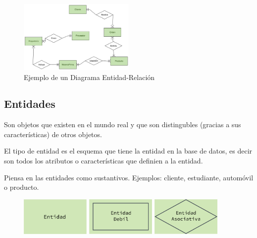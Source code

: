 \documentclass[12pt, fleqn]{report}                             %
\begin{document}
            \begin{figure}[h]
                \centering
                \includegraphics[width=0.50\textwidth]{ER-Diagram}
                \caption{Ejemplo de un Diagrama Entidad-Relación}
            \end{figure}




            \clearpage
            \subsection{Entidades}
                    
                Son objetos que existen en el mundo real y que son distingubles
                (gracias a sus características) de otros objetos.

                El tipo de entidad es el esquema que tiene la entidad en la base de datos,
                es decir son todos los atributos o características que definien a la entidad.

                Piensa en las entidades como sustantivos.
                Ejemplos: cliente, estudiante, automóvil o producto. 


                \begin{figure}[h]
                    \centering
                    \includegraphics[width=0.30\textwidth]{Entidad}
                    \includegraphics[width=0.30\textwidth]{EntidadDebil}
                    \includegraphics[width=0.30\textwidth]{EntidadAsociativa}
                \end{figure}
\end{document}
